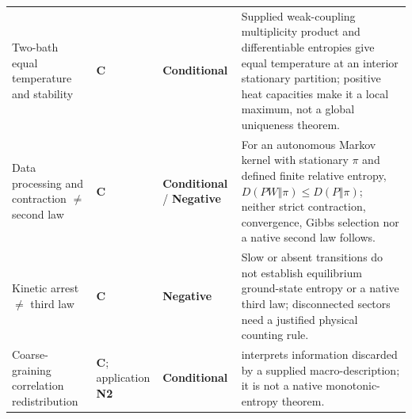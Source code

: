 \documentclass[11pt]{article}
\theoremstyle{definition}
\newcommand{\statusConditional}{\textcolor{yellow!60!black}{\textbf{Conditional}}}
\newcommand{\statusNegative}{\textcolor{red!65!black}{\textbf{Negative}}}
\newcommand{\natNTwo}{\textcolor{teal!70!black}{\textbf{N2}}}
\newcommand{\natControl}{\textcolor{gray!75!black}{\textbf{C}}}
\begin{document}
\begin{center}
\begin{longtable}{@{}P{3.5cm}P{1.7cm}P{2.5cm}P{5.6cm}@{}}
Two-bath equal temperature and stability
& \natControl{} & \statusConditional{}
& Supplied weak-coupling multiplicity product and differentiable entropies give equal temperature at an interior stationary partition; positive heat capacities make it a local maximum, not a global uniqueness theorem. \\
Data processing and contraction $\neq$ second law
& \natControl{} & \statusConditional{} / \statusNegative{}
& For an autonomous Markov kernel with stationary $\pi$ and defined finite relative entropy, $D(PW\Vert\pi)\leq D(P\Vert\pi)$; neither strict contraction, convergence, Gibbs selection nor a native second law follows. \\
Kinetic arrest $\neq$ third law
& \natControl{} & \statusNegative{}
& Slow or absent transitions do not establish equilibrium ground-state entropy or a native third law; disconnected sectors need a justified physical counting rule. \\
Coarse-graining correlation redistribution
& \natControl{}; application \natNTwo{} & \statusConditional{}
&  interprets information discarded by a supplied macro-description; it is not a native monotonic-entropy theorem. \\


\end{longtable}
\end{center}
\end{document}

